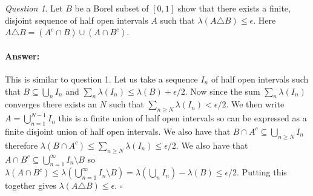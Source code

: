 \documentclass[11pt]{article}
\theoremstyle{definition}
\theoremstyle{remark}
\newtheorem{q}{Question}
\newenvironment{ans}{\paragraph{Answer:}}{\hfill$\square$ \vspace{20pt}}
\begin{document}
\begin{q}
Let $B$ be a Borel subset of $[0,1]$ show that there exists a finite, disjoint sequence of half open intervals $A$ such that $\lambda(A \triangle B) \leq \epsilon$. Here $A \triangle B = (A^c \cap B) \cup (A \cap B^c)$. 
\end{q}
\begin{ans}
This is similar to question 1. Let us take a sequence $I_n$ of half open intervals such that $B \subseteq \bigcup_n I_n$ and $\sum_n \lambda(I_n) \leq \lambda(B) + \epsilon/2$. Now since the sum $\sum_n \lambda(I_n)$ converges there exists an $N$ such that $\sum_{n \geq N} \lambda(I_n) < \epsilon/2$. We then write $A= \bigcup_{n=1}^{N-1}I_n$ this is a finite union of half open intervals so can be expressed as a finite disjoint union of half open intervals. We also have that $B \cap A^c \subseteq \bigcup_{n \geq N} I_n$ therefore $\lambda( B \cap A^c) \leq \sum_{n \geq N} \lambda(I_n) \leq \epsilon/2$. We also have that $A \cap B^c \subseteq \bigcup_{n=1}^\infty I_n \setminus B$ so $\lambda(A \cap B^c) \leq \lambda\left(\bigcup_{n=1}^\infty I_n \setminus B\right) = \lambda(\bigcup_n I_n) - \lambda(B) \leq \epsilon/2$. Putting this together gives $\lambda(A \triangle B) \leq \epsilon$.
\end{ans}
\end{document}

